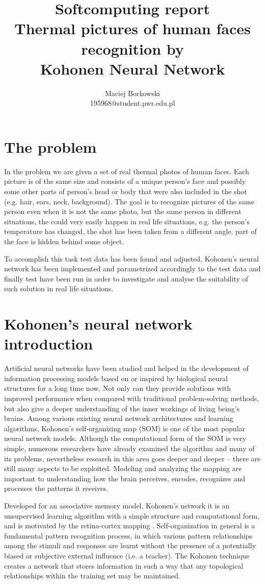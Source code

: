 \documentclass[pdftex]{article}
\date{}
\title{\vspace{10ex} Softcomputing report \\ \vspace{6ex} Thermal pictures of human faces recognition by \\ Kohonen Neural Network \vspace{32ex}}
\author{Maciej Borkowski\\ 195968@student.pwr.edu.pl}
\begin{document}
\thispagestyle{empty}
\maketitle

\clearpage
\section{The problem}
In the problem we are given a set of real thermal photos of human faces. Each picture is of the same size and consists of a unique person's face and possibly some other parts of person's head or body that were also included in the shot (e.g. hair, ears, neck, background). The goal is to recognize pictures of the same person even when it is not the same photo, but the same person in different situations, the could very easily happen in real life situations, e.g. the person's temperature has changed, the shot has been taken from a different angle, part of the face is hidden behind some object.

 To accomplish this task test data has been found and adjusted, Kohonen's neural network has been implemented and parametrized accordingly to the test data and finally test have been run in order to investigate and analyse the suitability of such solution in real life situations.

\section{Kohonen's neural network introduction}
Artificial neural networks have been studied and
helped in the development of information processing models based on or inspired by biological
neural structures for a long time now. Not only can they provide solutions with improved
performance when compared with traditional problem-solving methods, but
also give a deeper understanding of the inner workings of living being's brains. Among various
existing neural network architectures and learning algorithms, Kohonen’s self-organizing
map (SOM) is one of the most popular neural network models.  Although
the computational form of the SOM is very simple, numerous researchers
have already examined the algorithm and many of its problems, nevertheless
research in this area goes deeper and deeper – there are still many aspects to
be exploited. Modeling and analyzing the mapping are important to understanding how the brain
perceives, encodes, recognizes and processes the patterns it receives.

Developed for an associative memory model, Kohonen's network it is an unsupervised learning
algorithm with a simple structure and computational form, and is motivated
by the retina-cortex mapping \cite{kohonen}. Self-organization in general is a fundamental
pattern recognition process, in which various pattern relationships
among the stimuli and responses are learnt without the presence
of a potentially biased or subjective external influence (i.e. a teacher). The Kohonen technique creates a network that stores information in such a way that any topological relationships within the training set may be maintained.
\end{document}
